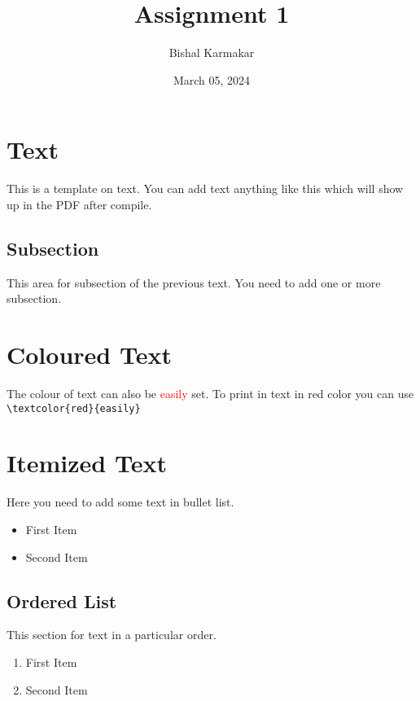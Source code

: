 \documentclass{article}
\title{\textbf{Assignment 1}}
\author{Bishal Karmakar}
\date{March 05, 2024}
\begin{document}
\maketitle
\noindent\hrulefill
\section{Text}
This is a template on text. You can add text anything like this which will show up in the PDF after compile.

\subsection{Subsection}
This area for subsection of the previous text. You need to add one or more subsection.

\section{Coloured Text}
The colour of text can also be \textcolor{red}{easily} set. To print in text in red color you can use \verb| \textcolor{red}{easily} |

\section{Itemized Text}
Here you need to add some text in bullet list.
\begin{itemize}
  \item First Item
  \item Second Item
\end{itemize}

\subsection{Ordered List}
This section for text in a particular order.
\begin{enumerate}
  \item First Item
  \item Second Item
\end{enumerate}
\end{document}
